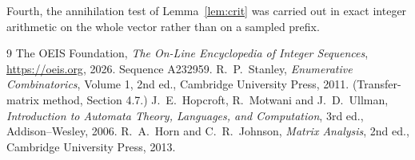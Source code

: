 \documentclass[11pt,a4paper]{article}
\theoremstyle{plain}
\theoremstyle{definition}
\begin{document}
Fourth, the annihilation test of Lemma~\ref{lem:crit} was carried out in exact integer
arithmetic on the whole vector rather than on a sampled prefix.

\begin{thebibliography}{9}
 The OEIS Foundation, \emph{The On-Line Encyclopedia of Integer
Sequences}, \url{https://oeis.org}, 2026. Sequence A232959.
 R.~P.~Stanley, \emph{Enumerative Combinatorics}, Volume 1, 2nd ed.,
Cambridge University Press, 2011. (Transfer-matrix method, Section 4.7.)
 J.~E.~Hopcroft, R.~Motwani and J.~D.~Ullman, \emph{Introduction to Automata
Theory, Languages, and Computation}, 3rd ed., Addison--Wesley, 2006.
 R.~A.~Horn and C.~R.~Johnson, \emph{Matrix Analysis}, 2nd ed., Cambridge
University Press, 2013.
\end{thebibliography}
\end{document}
